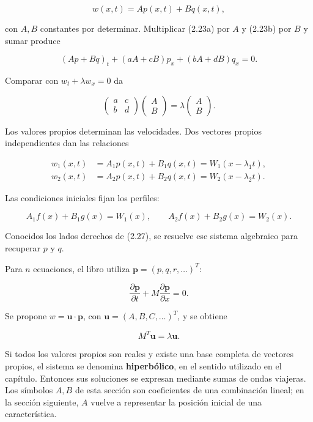 \documentclass[11pt,a4paper]{article}
\begin{document}
\[w(x,t)=Ap(x,t)+Bq(x,t),\tag{2.25}\]

con \(A,B\) constantes por determinar. Multiplicar (2.23a) por \(A\) y
(2.23b) por \(B\) y sumar produce

\[(Ap+Bq)_t+(aA+cB)p_x+(bA+dB)q_x=0.\]

Comparar con \(w_t+\lambda w_x=0\) da

\[\begin{pmatrix}a&c\\b&d\end{pmatrix}\begin{pmatrix}A\\B\end{pmatrix}=\lambda\begin{pmatrix}A\\B\end{pmatrix}.\tag{2.26}\]

Los valores propios determinan las velocidades. Dos vectores propios
independientes dan las relaciones

\[\begin{aligned}
w_1(x,t)&=A_1p(x,t)+B_1q(x,t)=W_1(x-\lambda_1t),\\
w_2(x,t)&=A_2p(x,t)+B_2q(x,t)=W_2(x-\lambda_2t).
\end{aligned}\tag{2.27}\]

Las condiciones iniciales fijan los perfiles:

\[A_1f(x)+B_1g(x)=W_1(x),\qquad A_2f(x)+B_2g(x)=W_2(x).\tag{2.28}\]

Conocidos los lados derechos de (2.27), se resuelve ese sistema
algebraico para recuperar \(p\) y \(q\).

Para \(n\) ecuaciones, el libro utiliza \(\mathbf p=(p,q,r,\ldots)^T\):

\[\frac{\partial\mathbf p}{\partial t}+M\frac{\partial\mathbf p}{\partial x}=0.\tag{2.29}\]

Se propone \(w=\mathbf u\cdot\mathbf p\), con
\(\mathbf u=(A,B,C,\ldots)^T\), y se obtiene

\[M^T\mathbf u=\lambda\mathbf u.\tag{2.30}\]

Si todos los valores propios son reales y existe una base completa de
vectores propios, el sistema se denomina \textbf{hiperbólico}, en el
sentido utilizado en el capítulo. Entonces sus soluciones se expresan
mediante sumas de ondas viajeras. Los símbolos \(A,B\) de esta sección
son coeficientes de una combinación lineal; en la sección siguiente,
\(A\) vuelve a representar la posición inicial de una característica.
\end{document}
